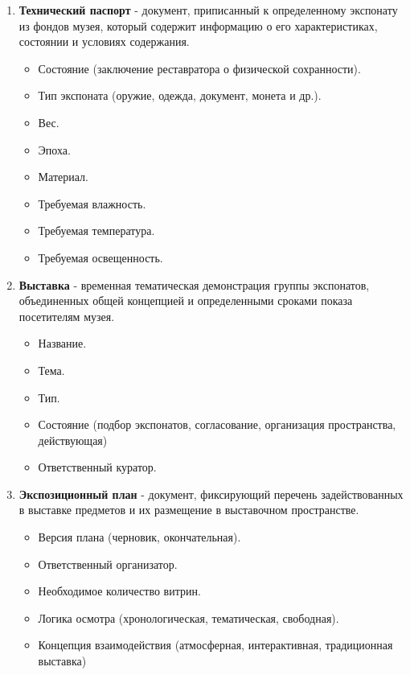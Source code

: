 \begin{enumerate}
    \item \textbf{Технический паспорт} - документ, приписанный к определенному экспонату из фондов музея, который содержит информацию о его характеристиках, состоянии и условиях содержания.
    \begin{itemize}
        \item Состояние (заключение реставратора о физической сохранности).
        \item Тип экспоната (оружие, одежда, документ, монета и др.).
        \item Вес.
        \item Эпоха.
        \item Материал.
        \item Требуемая влажность.
        \item Требуемая температура.
        \item Требуемая освещенность.
    \end{itemize}

    \item \textbf{Выставка} - временная тематическая демонстрация группы экспонатов, объединенных общей концепцией и определенными сроками показа посетителям музея.
    \begin{itemize}
        \item Название.
        \item Тема.
        \item Тип.
        \item Состояние (подбор экспонатов, согласование, организация пространства, действующая)
        \item Ответственный куратор.
    \end{itemize}

    \item \textbf{Экспозиционный план} - документ, фиксирующий перечень задействованных в выставке предметов и их размещение в выставочном пространстве.
    \begin{itemize}
        \item Версия плана (черновик, окончательная).
        \item Ответственный организатор.
        \item Необходимое количество витрин.
        \item Логика осмотра (хронологическая, тематическая, свободная).
        \item Концепция взаимодействия (атмосферная, интерактивная, традиционная выставка)
        
    \end{itemize}


\end{enumerate}
